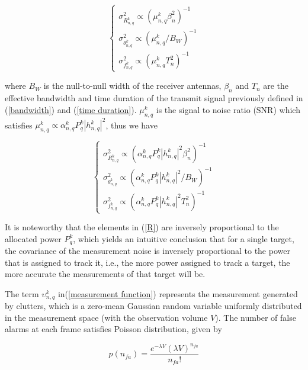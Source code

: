 \documentclass[12pt,journal,draftclsnofoot,onecolumn]{IEEEtran}
\begin{document}
\begin{equation}
	\begin{cases}
		\sigma _{R_{n,q}^k}^2 \propto {\left(\mu_{n,q}^k{\beta _n^2} \right)^{ - 1}}\\ 
		\sigma _{\theta _{n,q}^k}^2 \propto {\left(\mu_{n,q}^k/{B_{W}} \right)^{ - 1}} \\
		\sigma _{f_{n,q}^k}^2 \propto {\left(\mu_{n,q}^kT_n^2 \right)^{ - 1}}
	\end{cases}
\label{R}	
\end{equation}

where $B_W$ is the null-to-null width of the receiver antennas, $\beta _n$ and $T_n$ are the effective bandwidth and time duration of the transmit signal previously defined in (\ref{bandwidth}) and (\ref{time duration}). $\mu_{n,q}^k$ is the signal to noise ratio (SNR) which satisfies $\mu_{n,q}^k \propto \alpha _{n,q}^k P_{q}^k {\left| {h_{n,q}^k} \right|}^2$, thus we have

\begin{equation}
     \begin{cases}
     	\sigma _{R_{n,q}^k}^2 \propto {\left({\alpha _{n,q}^k P_{q}^k {{\left| {h_{n,q}^k} \right|}^2}{\beta _n^2}} \right)^{ - 1}}\\ 
     	\sigma _{\theta _{n,q}^k}^2 \propto {\left({\alpha _{n,q}^k P_{q}^k {{\left| {h_{n,q}^k} \right|}^2}}/{B_{W}} \right)^{ - 1}} \\
     	\sigma _{f_{n,q}^k}^2 \propto {\left({\alpha _{n,q}^k P_{q}^k {{\left| {h_{n,q}^k} \right|}^2}T_n^2} \right)^{ - 1}}
     \end{cases}
\end{equation}

It is noteworthy that the elements in (\ref{R}) are inversely proportional to the allocated power $P_{q}^k$, which yields an intuitive conclusion that for a single target, the covariance of the measurement noise is inversely proportional to the power that is assigned to track it, i.e., the more power assigned to track a target, the more accurate the measurements of that target will be.

The term $\upsilon_{n,q}^k$ in(\ref{measurement function}) represents the measurement generated by clutters, which is a zero-mean Gaussian random variable uniformly distributed in the measurement space (with the observation volume $V$). The number of false alarms at each frame satisfies Poisson distribution, given by 

\begin{equation}
	p(n_{fa})=\frac{e^{-\lambda V}(\lambda V)^{n_{fa}}}{n_{fa}!}
\end{equation} 
\end{document}
